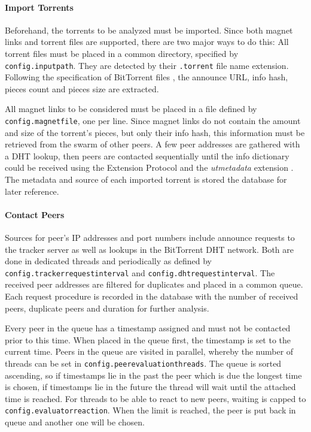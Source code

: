 \documentclass[10pt, a4paper, twoside, headsepline]{scrbook}
\renewcommand{\_}{\origunderscore\allowbreak}
\newcommand{\config}[1]{\texttt{config.\allowbreak #1}}
\begin{document}
\paragraph{Import Torrents}
Beforehand, the torrents to be analyzed must be imported. Since both magnet links and torrent files are supported, there are two major ways to do this: All torrent files must be placed in a common directory, specified by \config{input\_path}. They are detected by their \texttt{.torrent} file name extension. Following the specification of BitTorrent files \cite{bep3}, the announce URL, info hash, pieces count and pieces size are extracted.

All magnet links \cite{bep9} to be considered must be placed in a file defined by \config{magnet\_file}, one per line. Since magnet links do not contain the amount and size of the torrent's pieces, but only their info hash, this information must be retrieved from the swarm of other peers. A few peer addresses are gathered with a DHT lookup, then peers are contacted sequentially until the info dictionary could be received using the Extension Protocol \cite{bep10} and the \emph{ut\_metadata} extension \cite{bep9}. The metadata and source of each imported torrent is stored the database for later reference.

\paragraph{Contact Peers}
Sources for peer's IP addresses and port numbers include announce requests to the tracker server as well as lookups in the BitTorrent DHT network. Both are done in dedicated threads and periodically as defined by \config{tracker\_request\_interval} and \config{dht\_request\_interval}. The received peer addresses are filtered for duplicates and placed in a common queue. Each request procedure is recorded in the database with the number of received peers, duplicate peers and duration for further analysis.

Every peer in the queue has a timestamp assigned and must not be contacted prior to this time. When placed in the queue first, the timestamp is set to the current time. Peers in the queue are visited in parallel, whereby the number of threads can be set in \config{peer\_evaluation\_threads}. The queue is sorted ascending, so if timestamps lie in the past the peer which is due the longest time is chosen, if timestamps lie in the future the thread will wait until the attached time is reached. For threads to be able to react to new peers, waiting is capped to \config{evaluator\_reaction}. When the limit is reached, the peer is put back in queue and another one will be chosen.
\end{document}
